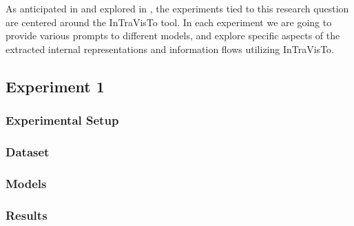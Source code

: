 As anticipated in  and explored in , the experiments tied to this research question are centered around the InTraVisTo tool.
In each experiment we are going to provide various prompts to different models, and explore specific aspects of the extracted internal representations and information flows utilizing InTraVisTo.

\subsection{Experiment 1}

\subsubsection{Experimental Setup}

\subsubsection{Dataset}

\subsubsection{Models}

\subsubsection{Results}

